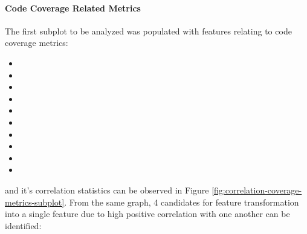\paragraph{Code Coverage Related Metrics}\label{sec:impl-data-analysis:corr:code-coverage}
The first subplot to be analyzed was populated with features relating to code coverage metrics:
\begin{itemize}\label{lst:code-coverage-candidates}
    \item \branchCoverage{}
    \item \overallBranchCoverage{}
    \item \overallCoverage{}
    \item \overallLineCoverage{}
    \item \overallUncoveredConditions{}
    \item \overallUncoveredLines{}
    \item \coverage{}
    \item \lineCoverage{}
    \item \uncoveredConditions{}
    \item \uncoveredLines{}
\end{itemize}
and it's correlation statistics can be observed in Figure \ref{fig:correlation-coverage-metrics-subplot}. From the same graph, 4 candidates for feature transformation into a single feature due to high positive correlation with one another can be identified:
